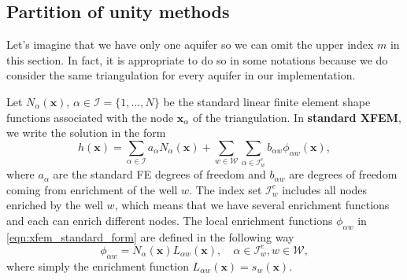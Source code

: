 \documentclass[preprint,12pt,authoryear]{elsarticle}
\newcommand{\bx}{\mathbf{x}}
\begin{document}
    
\subsection{Partition of unity methods}
Let's imagine that we have only one aquifer so we can omit the upper index $m$ in this section.
In fact, it is appropriate to do so in some notations because we do consider the same triangulation for every
aquifer in our implementation.

Let $N_\alpha(\bx)$, $\alpha\in\mathcal{I}=\{1,\ldots,N\}$ be the standard linear finite element shape 
functions associated with the node $\bx_\alpha$ of the triangulation. 
In \textbf{standard XFEM}, we write the solution in the form
\begin{equation} \label{eqn:xfem_standard_form}
  h(\bx) = \sum \limits_{\alpha\in\mathcal{I}}a_\alpha N_\alpha(\bx)
    + \sum \limits_{w\in\mathcal{W}} \sum \limits_{\alpha\in\mathcal{I}^e_w} b_{\alpha w} \phi_{\alpha w}(\bx),
\end{equation}
where $a_\alpha$ are the standard FE degrees of freedom and $b_{\alpha w}$ are degrees of freedom coming from
enrichment of the well $w$. The index set $\mathcal{I}^e_w$ includes all nodes enriched by the well $w$, which
means that we have several enrichment functions and each can enrich different nodes.
The local enrichment functions $\phi_{\alpha w}$ in \eqref{eqn:xfem_standard_form} are defined
in the following way
\begin{equation} \label{eqn:xfem_enrich}
    \phi_{\alpha w} = N_\alpha(\bx)L_{\alpha w}(\bx), \quad \alpha\in\mathcal{I}^e_w, w\in\mathcal{W},
\end{equation}
where simply the enrichment function $L_{\alpha w}(\bx) = s_w(\bx)$.
\end{document}
